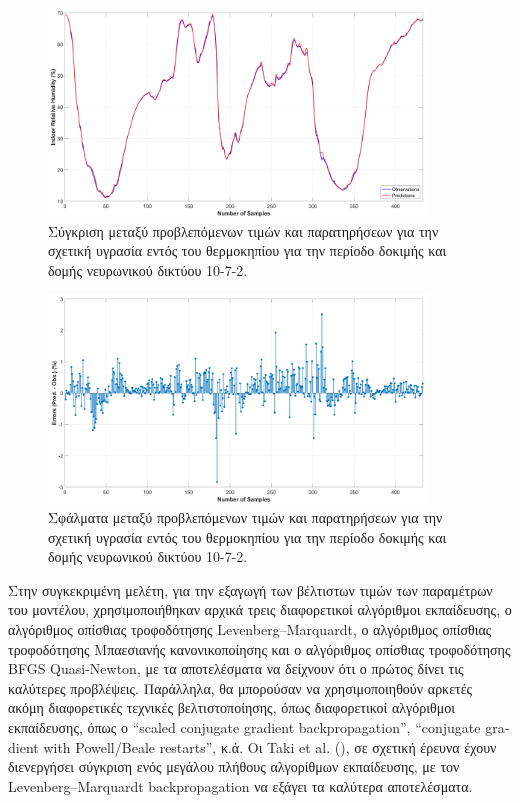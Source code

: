 \documentclass[12pt, a4paper]{report} %
\newcommand{\english}{\foreignlanguage{english}}
\begin{document}
\begin{figure}[ht]%
    \centering
    \includegraphics[width=0.9\textwidth]{Figures/NN_RH_in_pred.png}
    \caption{Σύγκριση μεταξύ προβλεπόμενων τιμών και παρατηρήσεων για την σχετική υγρασία εντός του θερμοκηπίου για 
    την περίοδο δοκιμής και δομής νευρωνικού δικτύου 10-7-2.}
    \label{fig_NN_RH_in_pred}
\end{figure}


\begin{figure}[ht]%
    \centering
    \includegraphics[width=0.9\textwidth]{Figures/NN_RH_in_errors.png}
    \caption{Σφάλματα μεταξύ προβλεπόμενων τιμών και παρατηρήσεων για την σχετική υγρασία εντός του θερμοκηπίου για 
    την περίοδο δοκιμής και δομής νευρωνικού δικτύου 10-7-2.}
    \label{fig_NN_RH_in_errors}
\end{figure}

\clearpage

Στην συγκεκριμένη μελέτη, για την εξαγωγή των βέλτιστων τιμών των παραμέτρων του μοντέλου, χρησιμοποιήθηκαν αρχικά τρεις 
διαφορετικοί αλγόριθμοι εκπαίδευσης, ο αλγόριθμος οπίσθιας τροφοδότησης \english{Levenberg–Marquardt}, ο αλγόριθμος 
οπίσθιας τροφοδότησης Μπαεσιανής κανονικοποίησης και ο αλγόριθμος οπίσθιας τροφοδότησης \english{BFGS Quasi-Newton}, 
με τα αποτελέσματα να δείχνουν ότι ο πρώτος δίνει τις καλύτερες προβλέψεις. Παράλληλα, θα μπορού\-σαν να χρησιμοποιηθούν 
αρκετές ακόμη διαφορετικές τεχνικές βελτιστοποίησης, όπως διαφορετικοί αλγόριθμοι εκπαίδευσης, όπως ο 
“\english{scaled conjugate gradient backpropagation}”, “\english{conjugate gradient with Powell/Beale restarts}”, κ.ά. 
Οι \english{Taki et al.} (\citeyear{neural_bib16}), σε σχετική έρευνα έχουν διενεργήσει σύγκριση ενός μεγάλου πλήθους αλγορίθμων 
εκπαίδευσης, με τον \english{Levenberg–Marquardt backpropagation} να εξάγει τα καλύτερα αποτελέσματα.
\end{document}
